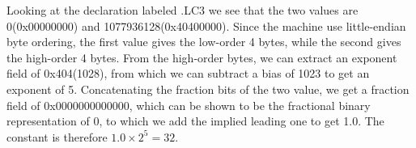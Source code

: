\documentclass{article}
\begin{document}
Looking at the declaration labeled .LC3 we see that the two values are 0(0x00000000)
and 1077936128(0x40400000). Since the machine use little-endian byte ordering, the
first value gives the low-order 4 bytes, while the second gives the high-order 4 bytes.	
From the high-order bytes, we can extract an exponent field of 0x404(1028), from
which we can subtract a bias of 1023 to get an exponent of 5. Concatenating the
fraction bits of the two value, we get a fraction field of 0x0000000000000, which
can be shown to be the fractional binary representation of 0, to which we add the
implied leading one to get 1.0. The constant is therefore $1.0 \times 2^5 = 32$.
\end{document}
